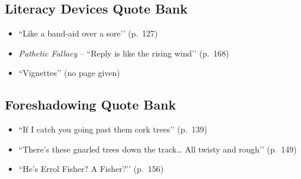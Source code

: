 \documentclass[a4paper]{article}
\begin{document}
\subsection{Literacy Devices Quote Bank}
\begin{itemize}
    \item ``Like a band-aid over a sore’’ (p.~127)
    \item \textit{Pathetic Fallacy} – ``Reply is like the rising wind’’ (p.~168)
    \item ``Vignettes’’ (no page given)
\end{itemize}

\subsection{Foreshadowing Quote Bank}
\begin{itemize}
    \item ``If I catch you going past them cork trees’’ (p.~139)
    \item ``There’s these gnarled trees down the track… All twisty and rough’’ (p.~149)
    \item ``He’s Errol Fisher? A Fisher?’’ (p.~156)
\end{itemize}
\end{document}
